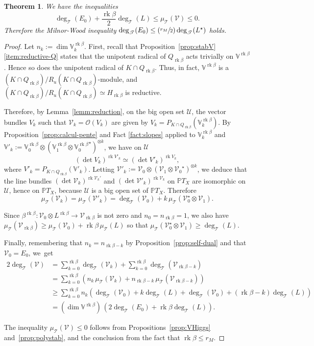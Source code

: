 \documentclass[JEP,XML,SOM,Unicode,NoFloatCountersInSection]{cedram}
\let\mathcal\mathscr
\newcommand{\Psfrac}[2]{(\sfrac{#1}{#2})}
\theoremstyle{plain}
\newtheorem{theo}{Theorem}[section]
\theoremstyle{definition}
\DeclareMathOperator{\rk}{rk}
\newcommand{\cO}{\mathcal{O}}
\newcommand{\cT}{\mathcal{T}}
\newcommand{\cU}{\mathcal{U}}
\newcommand{\cV}{\mathcal{V}}
\newcommand{\bV}{\mathbb{V}}
\newcommand{\PTX}{{\mathbb{P}T_X}}
\newcommand{\Vb}{\mathbb{V}^{\rgb}}
\newcommand{\rkm}{{r_M}}
\newcommand{\rgb}{{\rk\beta}}
\begin{document}
\begin{theo}
\label{theo:MW} We have the inequalities
$$\deg_\cT(E_0)+\frac{\rk\beta}{2}\deg_\cT(L) \leq\mu_\cT(\cV)\leq 0.$$
Therefore the
Milnor-Wood inequality
$\deg_\cT(E_0)\leq \Psfrac \rkm{2}\deg_\cT(L^\star)$ holds.
\end{theo}

\begin{proof}
Let $n_k:=\dim \Vb_k$.
First, recall that Proposition~\ref{prop:stabV}\,\eqref{item:reductive-Q} states that the unipotent
radical of $Q_\rgb$ acts trivially on $\Vb$.
Hence so does the unipotent radical of $K \cap Q_\rgb$. Thus, in fact, $\Vb$ is a $(K \cap Q_\rgb)/R_u(K
\cap Q_\rgb)$-module, and
\hbox{$(K \cap Q_\rgb)/R_u(K \cap Q_\rgb) \simeq H_\rgb$} is reductive.

Therefore, by Lemma~\ref{lemm:reduction}, on the big open set $\cU$, the vector bundles $V_k$ such that
$\cV_k=\cO(V_k)$ are given by $V_k=P_{K\cap Q_\rgb}(\Vb_k)$.
By Proposition~\ref{prop:calcul-pente} and Fact \ref{fact:slopes} applied to
$\Vb_k$ and $\bV'_k:=\Vb_0 \otimes (\Vb_1 \otimes {\Vb_0}^\star)^{\otimes k}$, we have on $\cU$
$$
(\det V_k)^{\rk V'_k} \simeq (\det V'_k)^{\rk V_k},
$$
where $V'_k=P_{K\cap Q_\rgb}(\bV'_k)$. Letting $\cV'_k:=\cV_0 \otimes (\cV_1 \otimes
{\cV_0}^\star)^{\otimes k}$, we deduce that the line bundles $(\det \cV_k)^{\rk \cV_k'}$ and
$(\det \cV'_k)^{\rk \cV_k}$ on $\PTX$ are isomorphic on $\cU$, hence on $\PTX$, because $\cU$ is a
big open set of $\PTX$. Therefore
$$
\mu_\cT(\cV_k)=\mu_\cT(\cV'_k)=\deg_\cT(\cV_0)+k\,\mu_\cT(\cV_0^\star\otimes\cV_1).
$$

Since $\beta^\rgb:\cV_0\otimes L^\rgb\to\cV_\rgb$ is not zero and $n_0=n_\rgb=1$, we also have $\mu_\cT(\cV_\rgb)\geq \mu_\cT(\cV_0)+\rgb\,\mu_\cT(L)$ so that $\mu_\cT(\cV_0^\star\otimes\cV_1)\geq \deg_\cT (L)$.

Finally, remembering that $n_k=n_{\rgb-k}$ by Proposition~\ref{prop:self-dual} and that $\cV_0=E_0$, we~get
\begin{align*}
2\deg_\cT(\cV) & = \sum_{k=0}^\rgb \deg_\cT(\cV_k)+\sum_{k=0}^\rgb \deg_\cT(\cV_{\rgb-k}) \\
& = \sum_{k=0}^\rgb \left({ n_k\,\mu_\cT(\cV_k)+n_{\rgb-k}\, \mu_\cT(\cV_{\rgb-k})}\right) \\
& \geq \sum_{k=0}^\rgb n_k \left(\deg_\cT(\cV_0)+k\deg_\cT(L)+ \deg_\cT(\cV_0)+(\rgb-k)\deg_\cT(L)\right) \\
& = (\dim\Vb)\,(2\deg_\cT(E_0)+\rgb\deg_\cT(L)).
\end{align*}

The inequality $\mu_\cT(\cV)\leq 0$ follows from Propositions~\ref{prop:VHiggs}
and~\ref{prop:polystab},
and the
conclusion from the fact that $\rk\beta\leq \rkm$.
\end{proof}
\end{document}
